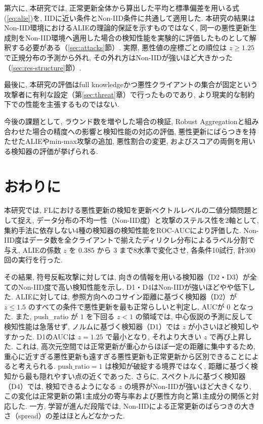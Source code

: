 \documentclass[a4j, twocolumn, dvipdfmx]{jsarticle}
\newcommand{\PushRatio}{\textrm{push\_ratio}}
\newcommand{\Spread}{\textrm{spread}}
\begin{document}
第六に, 本研究では, 正常更新全体から算出した平均と標準偏差を用いる式(\ref{eq:alie})を, IIDに近い条件とNon-IID条件に共通して適用した. 本研究の結果はNon-IID環境におけるALIEの理論的保証を示すものではなく, 同一の悪性更新生成則をNon-IID環境へ適用した場合の検知性能を実験的に評価したものとして解釈する必要がある（\ref{sec:attacks}節）. 実際, 悪性値の座標ごとの順位は $z \ge 1.25$ で正規分布の予測から外れ, その外れ方はNon-IIDが強いほど大きかった（\ref{sec:res-structure}節）.

最後に, 本研究の評価はfull knowledgeかつ悪性クライアントの集合が固定という攻撃者に有利な設定（第\ref{sec:threat}章）で行ったものであり, より現実的な制約下での性能を主張するものではない.

今後の課題として, ラウンド数を増やした場合の検証, Robust Aggregationと組み合わせた場合の精度への影響と検知性能の対応の評価, 悪性更新にばらつきを持たせたALIEやmin-max攻撃\cite{shejwalkar2021manipulating}の追加, 悪性割合の変更, およびスコアの両側を用いる検知器の評価が挙げられる.

\section{おわりに}
\label{sec:conclusion}

本研究では, FLにおける悪性更新の検知を更新ベクトルレベルの二値分類問題として捉え, データ分布の不均一性（Non-IID度）と攻撃のステルス性を2軸として, 集約手法に依存しない4種の検知器の検知性能をROC-AUCにより評価した. Non-IID度はデータ数を全クライアントで揃えたディリクレ分布によるラベル分割で与え, ALIEの係数 $z$ を $0.385$ から $3$ まで8水準で変化させ, 各条件10試行, 計300回の実行を行った.

その結果, 符号反転攻撃に対しては, 向きの情報を用いる検知器（D2・D3）が全てのNon-IID度で高い検知性能を示し, D1・D4はNon-IIDが強いほどやや低下した. ALIEに対しては, 参照方向へのコサイン距離に基づく検知器（D2）が $z \le 1.5$ のすべての条件で悪性更新を最も正常らしいと判定し, AUCが $0$ となった. また, \PushRatio{} が $1$ を下回る $z<1$ の領域では, 中心仮説の予測に反して検知性能は急落せず, ノルムに基づく検知器（D1）では $z$ が小さいほど検知しやすかった. D1のAUCは $z=1.25$ で最小となり, それより大きい $z$ で再び上昇した. これは, 高次元空間では正常更新が重心からほぼ一定の距離に集中するため, 重心に近すぎる悪性更新も遠すぎる悪性更新も正常更新から区別できることによると考えられる. $\PushRatio=1$ は検知が破綻する境界ではなく, 距離に基づく検知から最も隠れやすい点の近くであった. さらに, スペクトルに基づく検知器（D4）では, 検知できるようになる $z$ の境界がNon-IIDが強いほど大きくなり, この変化は正常更新の第1主成分の寄与率および悪性方向と第1主成分の関係と対応した. 一方, 学習が進んだ段階では, Non-IIDによる正常更新のばらつきの大きさ（\Spread{}）の差はほとんどなかった.
\end{document}
